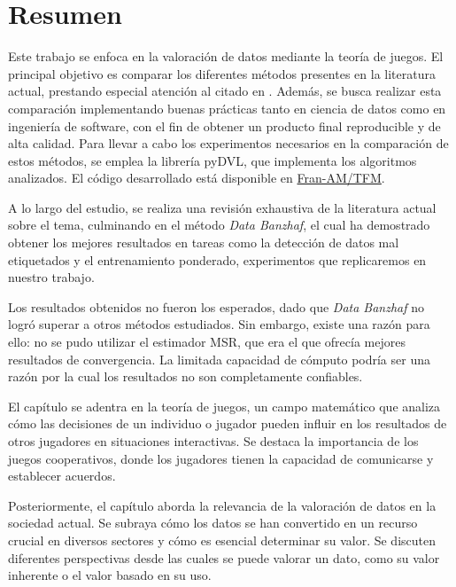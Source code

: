 \chapter*{Resumen}
\justifying

Este trabajo se enfoca en la valoración de datos mediante la
teoría de juegos. El principal objetivo es comparar los
diferentes métodos presentes en la literatura actual,
prestando especial atención al citado en \cite{dataBanzhaf}.
Además, se busca realizar esta comparación implementando
buenas prácticas tanto en ciencia de datos como en ingeniería
de software, con el fin de obtener un producto final
reproducible y de alta calidad. Para llevar a cabo los
experimentos necesarios en la comparación de estos
métodos, se emplea la librería pyDVL, que implementa los
algoritmos analizados. El código desarrollado está
disponible en \href{https://github.com/Fran-AM/TFM}{Fran-AM/TFM}.

A lo largo del estudio, se realiza una revisión exhaustiva de la
literatura actual sobre el tema, culminando en el método
\textit{Data Banzhaf}, el cual ha demostrado obtener los mejores
resultados en tareas como la detección de datos mal etiquetados
y el entrenamiento ponderado, experimentos que replicaremos en
nuestro trabajo.

Los resultados obtenidos no fueron los esperados, dado que
\textit{Data Banzhaf} no logró superar a otros métodos
estudiados. Sin embargo, existe una razón para ello: no se
pudo utilizar el estimador MSR, que era el que ofrecía mejores
resultados de convergencia. La limitada capacidad de cómputo
podría ser una razón por la cual los resultados no son
completamente confiables.






El capítulo se adentra en la teoría de juegos, un campo
matemático que analiza cómo las decisiones de un individuo
o jugador pueden influir en los resultados de otros jugadores
en situaciones interactivas. Se destaca la importancia de los
juegos cooperativos, donde los jugadores tienen la capacidad
de comunicarse y establecer acuerdos.

Posteriormente, el capítulo aborda la relevancia de la
valoración de datos en la sociedad actual. Se subraya cómo
los datos se han convertido en un recurso crucial en
diversos sectores y cómo es esencial determinar su valor.
Se discuten diferentes perspectivas desde las cuales se
puede valorar un dato, como su valor inherente o el valor
basado en su uso.

